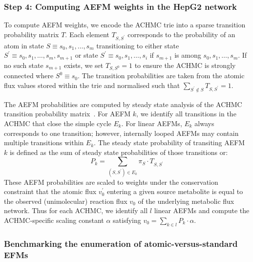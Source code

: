 \documentclass[12pt]{article}
\begin{document}
\subsubsection*{Step 4: Computing AEFM weights in the HepG2 network}

To compute AEFM weights, we encode the ACHMC trie into a sparse transition
probability matrix $T$. Each element $T_{S,S^\prime}$ corresponds to the
probability of an atom in state $S \equiv s_0, s_1, \ldots, s_m$
transitioning to either state $S^\prime \equiv s_0, s_1, \ldots, s_m,
s_{m+1}$ or state $S^\prime \equiv s_0, s_1, \ldots, s_i$ if $s_{m+1}$ is
among $s_0, s_1, \ldots, s_m$. If no such state $s_{m+1}$ exists, we set
$T_{S,S^0} = 1$ to ensure the ACHMC is strongly connected where $S^0
\equiv s_0$. The transition probabilities are taken from the atomic flux
values stored within the trie and normalised such that
$\sum_{S^{\prime}\notin S} T_{S,S^{\prime}} = 1$.

The AEFM probabilities are computed by steady state analysis of the ACHMC
transition probability matrix~\citep{ChitpinJustinG2023AMct}. For AEFM
$k$, we identify all transitions in the ACHMC that close the simple cycle
$E_k$. For linear AEFMs, $E_k$ always corresponds to one transition;
however, internally looped AEFMs may contain multiple transitions within
$E_k$. The steady state probability of transiting AEFM $k$ is defined as
the sum of steady state probabilities of those transitions or:
%
\begin{equation}
    P_k = \sum_{(S,S^\prime) \in E_k} \pi_S \cdot T_{S, S^\prime}
\end{equation}
%
These AEFM probabilities are scaled to weights under the conservation
constraint that the atomic flux $v^\prime_0$ entering a given source
metabolite is equal to the observed (unimolecular) reaction flux $v_0$ of
the underlying metabolic flux network. Thus for each ACHMC, we identify
all $l$ linear AEFMs and compute the ACHMC-specific scaling constant
$\alpha$ satisfying $v_0 = \sum_{k \in l}P_k \cdot \alpha$. 

\subsubsection*{Benchmarking the enumeration of atomic-versus-standard EFMs}
\end{document}
